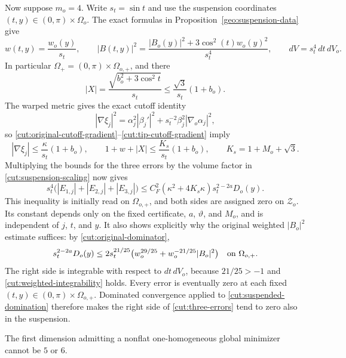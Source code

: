 Now suppose $m_o=4$.  Write $s_t=\sin t$ and use the suspension
coordinates $(t,y)\in(0,\pi)\times\Omega_o$.  The exact formulas in
Proposition~\ref{geo:suspension-data} give
\begin{equation}\label{cut:suspension-scaling}
 w(t,y)=\frac{w_o(y)}{s_t},\qquad
 |B(t,y)|^2
  =\frac{|B_o(y)|^2+3\cos^2(t)w_o(y)^2}{s_t^4},\qquad
 dV=s_t^4\,dt\,dV_o.
\end{equation}
In particular $\Omega_+=(0,\pi)\times\Omega_{o,+}$, and there
\[
 |X|=\frac{\sqrt{b_o^2+3\cos^2t}}{s_t}
       \leq\frac{\sqrt3}{s_t}(1+b_o).
\]
The warped metric gives the exact cutoff identity
\[
 |\nabla\xi_j|^2
 =\alpha_j^2|\beta_j'|^2
   +s_t^{-2}\beta_j^2|\nabla_o\alpha_j|^2,
\]
so \eqref{cut:original-cutoff-gradient}--\eqref{cut:tip-cutoff-gradient}
imply
\begin{equation}\label{cut:suspended-gradient-bounds}
 |\nabla\xi_j|\leq\frac{\kappa}{s_t}(1+b_o),\qquad
 1+w+|X|\leq\frac{K_s}{s_t}(1+b_o),\qquad
 K_s=1+M_o+\sqrt3.
\end{equation}
Multiplying the bounds for the three errors by the volume factor in
\eqref{cut:suspension-scaling} now gives
\begin{equation}\label{cut:suspended-domination}
 s_t^4\bigl(|E_{1,j}|+|E_{2,j}|+|E_{3,j}|\bigr)
 \leq C_F^2(\kappa^2+4K_s\kappa)
          s_t^{2-2a}D_o(y).
\end{equation}
This inequality is initially read on $\Omega_{o,+}$, and both sides are
assigned zero on $\mathcal Z_o$.  Its constant depends only on the
fixed certificate, $a$, $\vartheta$, and $M_o$, and is independent of
$j$, $t$, and $y$.  It also shows explicitly why the original weighted
$|B_o|^2$ estimate suffices: by \eqref{cut:original-dominator},
\[
 s_t^{2-2a}D_o(y)
 \leq 2s_t^{21/25}
       \bigl(w_o^{29/25}+w_o^{-21/25}|B_o|^2\bigr)
 \quad\hbox{on }\Omega_{o,+}.
\]
The right side is integrable with respect to $dt\,dV_o$, because
$21/25>-1$ and \eqref{cut:weighted-integrability} holds.  Every error
is eventually zero at each fixed $(t,y)\in(0,\pi)\times\Omega_{o,+}$.
Dominated convergence applied to \eqref{cut:suspended-domination}
therefore makes the right side of \eqref{cut:three-errors} tend to zero
also in the suspension.

\begin{theorem}\label{cut:exclusion}
The first dimension admitting a nonflat one-homogeneous global minimizer
cannot be $5$ or $6$.
\end{theorem}

